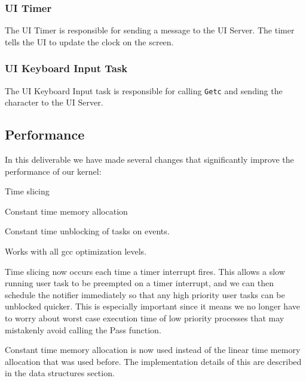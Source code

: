 \documentclass[letterpaper]{article}
\begin{document}
\subsubsection{UI Timer%
  \label{ui-timer}%
}

The UI Timer is responsible for sending a message to the UI Server. The timer tells the UI to update the clock on the screen.


\subsubsection{UI Keyboard Input Task%
  \label{ui-keyboard-input-task}%
}

The UI Keyboard Input task is responsible for calling \texttt{Getc} and sending the character to the UI Server.


\subsection{Performance%
  \label{performance}%
}

In this deliverable we have made several changes that significantly improve the performance of our kernel:
\setcounter{listcnt0}{0}
\begin{list}{)}
{
\setlength{\rightmargin}{\leftmargin}
}

\item Time slicing

\item Constant time memory allocation

\item Constant time unblocking of tasks on events.

\item Works with all gcc optimization levels.
\end{list}

Time slicing now occurs each time a timer interrupt fires.  This allows a slow running user task to be preempted on a timer interrupt, and we can then schedule the notifier immediately so that any high priority user tasks can be unblocked quicker.  This is especially important since it means we no longer have to worry about worst case execution time of low priority processes that may mistakenly avoid calling the Pass function.

Constant time memory allocation is now used instead of the linear time memory allocation that was used before.  The implementation details of this are described in the data structures section.
\end{document}
